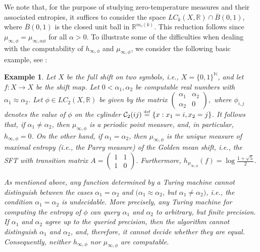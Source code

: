 \documentclass[11pt, reqno]{amsart}
\newcommand{\eqdef}{\stackrel{\scriptscriptstyle\rm def}{=}}
\newtheorem{example}[theorem]{Example}
\newcommand{\bR}{{\mathbb R}}
\newcommand{\bN}{{\mathbb N}}
\newcommand{\cC}{{\mathcal C}}
\begin{document}
We note that, for the purpose of studying  zero-temperature measures and their associated entropies, it suffices to  consider the space   $LC_k(X,\mathbb{R})\cap \overline{B}(0,1)$, where $\overline{B}(0,1)$ is the closed unit ball in $\mathbb{R}^{m_c(k)}$. This reduction follows since $\mu_{\infty,\phi}=\mu_{\infty,\alpha \phi}$ for all $\alpha>0$.  
To illustrate some of the difficulties when dealing with the  computability of $h_{\infty,\phi}$ and $\mu_{\infty,\phi}$, we consider the following basic example, see \cite{Br,WY}:
\begin{example}
Let $X$ be the full shift on two symbols, i.e., $X=\{0,1\}^\bN$, and let $f:X\to X$ be the shift map.  Let $0<\alpha_1,\alpha_2$ be computable real numbers with $\alpha_1\approx\alpha_2$.  Let $\phi\in LC_2(X,\bR)$ be given by the matrix $\begin{pmatrix}
\alpha_1&\alpha_2\\
\alpha_2&0
\end{pmatrix},$ where $\phi_{i,j}$ denotes the value of $\phi$ on the cylinder $\cC_2(ij)\eqdef\{x: x_1=i, x_2=j\}$.  It follows that, if $\alpha_1\not=\alpha_2$, then $\mu_{\infty,\phi}$ is a periodic point measure, and, in particular, $h_{\infty,\phi}=0$. On the other hand, if $\alpha_1=\alpha_2$, then $\mu_{\infty,\phi}$ is the unique measure of maximal entropy (i.e., the Parry measure) of the Golden mean shift, i.e., the SFT with transition matrix $A=
\begin{pmatrix}
1&1\\
1&0
\end{pmatrix}$. Furthermore,  $h_{\mu_{\infty,\phi}}(f)=\log \frac{1+\sqrt{5}}{2}$.

As mentioned above, any function determined by a Turing machine cannot distinguish between the cases $\alpha_1=\alpha_2$ and $(\alpha_1\approx\alpha_2$, but $\alpha_1\not=\alpha_2)$, i.e., the condition $\alpha_1=\alpha_2$ is undecidable.  More precisely, any Turing machine for computing the entropy of $\phi$ can query $\alpha_1$ and $\alpha_2$ to arbitrary, but finite precision.  If $\alpha_1$ and $\alpha_2$ agree up to the queried precision, then the algorithm cannot distinguish $\alpha_1$ and $\alpha_2$, and, therefore, it cannot decide whether they are equal.  Consequently, neither $h_{\infty,\phi}$ nor $\mu_{\infty,\phi}$ are computable. 
\end{example}
\end{document}
